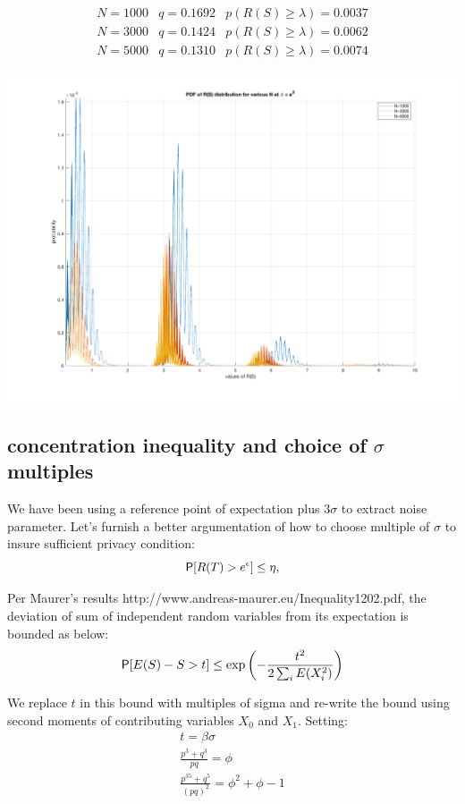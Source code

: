 \documentclass[11pt]{article}
\begin{document}
  \[
  \begin{matrix}N = 1000 & q = 0.1692 & p(R(S) \ge \lambda) = 0.0037 \\
  N= 3000 & q = 0.1424 & p(R(S) \ge \lambda) = 0.0062  \\
  N=5000 & q = 0.1310 & p(R(S) \ge \lambda) = 0.0074 \end{matrix} 
 \]
 
 \includegraphics[scale =  0.25]{nPn5.png}
 
 \subsection{concentration inequality and choice of $\sigma$ multiples}
 We have been using a reference point of expectation plus $3\sigma$ to extract noise parameter.  Let's furnish a better argumentation of how to choose multiple of $\sigma$ to insure sufficient privacy condition:
 \begin{equation*}
\P[R(T) > e^\epsilon] \leq \eta,
\end{equation*}

Per Maurer's results http://www.andreas-maurer.eu/Inequality1202.pdf, the deviation of sum of independent random variables from its expectation is bounded as below:
 \begin{equation*}
\P[E(S) -S > t] \leq  \exp \left (- \frac{t^2} {2 \sum_i E(X_i^2)} \right )
\end{equation*}

We replace $t$ in this bound with multiples of sigma and re-write the bound using second moments of contributing variables $X_0$ and $X_1$.  Setting:
 \begin{align*}
 t = \beta \sigma \\
\frac{p^3 + q^3}{pq} = \phi \\
\frac{p^35+ q^5}{(pq)^2} = \phi^2 + \phi -1
\end{align*}
\end{document}
